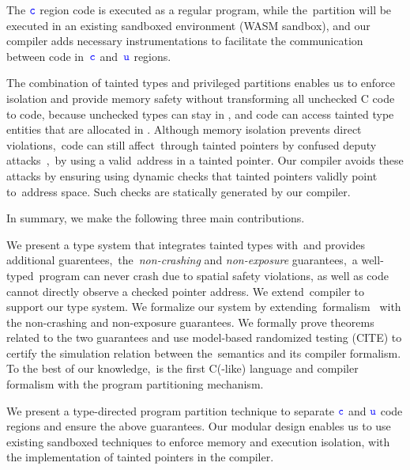 The $\textcolor{blue}{\texttt{c}}$ region code is executed as a regular program, while the~\ucregion partition will be executed in an existing sandboxed environment (\eg WASM sandbox), and our compiler adds necessary instrumentations to facilitate the communication between code in~$\textcolor{blue}{\texttt{c}}$ and~$\textcolor{blue}{\texttt{u}}$ regions.

The combination of tainted types and privileged partitions 
enables us to enforce isolation and provide memory safety without transforming all unchecked C code to \checkedc code,
because unchecked types can stay in \ucregion, and \cregion code can access tainted type entities that are allocated 
in \ucregion.
% 
Although memory isolation prevents direct violations,~\ucregion code can still affect~\cregion through tainted pointers by confused deputy attacks~\cite{rajani2016access, machiry2017boomerang},~\eg by using a valid~\cregion address in a tainted pointer.
Our compiler avoids these attacks by ensuring using dynamic checks that tainted pointers validly point to~\ucregion address space.
Such checks are statically generated by our compiler.

In summary, we make the following three main contributions.

We present a type system that integrates tainted types with~\checkedc and provides additional guarentees,~\ie the~\emph{non-crashing} and \emph{non-exposure} guarantees,~\ie a well-typed~\systemname program can never crash due to spatial safety violations,
as well as \ucregion code cannot directly observe a checked pointer address.
We extend~\checkedc compiler to support our type system.
We formalize our system by extending~\checkedc formalism~\citet{li22checkedc} with the non-crashing and non-exposure guarantees.
We formally prove theorems related to the two guarantees and use model-based randomized testing (CITE) to certify the simulation relation between the~\systemname semantics and its compiler formalism.
To the best of our knowledge,~\systemname is the first C(-like) language and compiler formalism with the program partitioning mechanism.

We present a type-directed program partition technique to separate $\textcolor{blue}{\texttt{c}}$ and $\textcolor{blue}{\texttt{u}}$ code regions and ensure the above guarantees.
Our modular design enables us to use existing sandboxed techniques to enforce memory and execution isolation, with the implementation of tainted pointers in the \systemname compiler.

